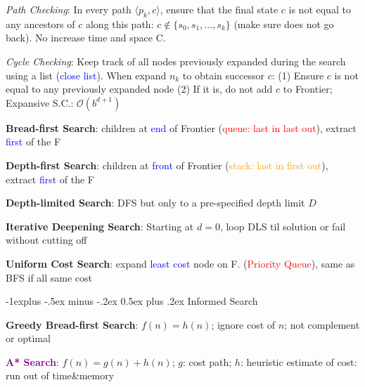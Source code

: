 \documentclass[7pt,landscape]{article}
\makeatletter
\renewcommand{\subsection}{\@startsection{subsection}{2}{0mm}%
                                {-1explus -.5ex minus -.2ex}%
                                {0.5ex plus .2ex}%
                                {\normalfont\normalsize\bfseries}}
\makeatother
\begin{document}
\begin{multicols}{2}
\textit{Path Checking}: In every path $\langle p_k, c \rangle$, ensure that the final state $c$ is not equal to any ancestors of $c$ along this path: $c \notin \{ s_0, s_1, ..., s_k\}$  (make sure does not go back). No increase time and space C.

\textit{Cycle Checking}: Keep track of all nodes previously expanded during the search using a list (\textcolor{blue}{close list}). When expand $n_k$ to obtain successor $c$: (1) Ensure $c$ is not equal to any previously expanded node (2) If it is, do not add $c$ to Frontier; Expansive S.C.: $\mathcal{O} (b^{d +1})$

\textbf{Bread-first Search}: children at \textcolor{blue}{end} of Frontier (\textcolor{red}{queue: last in last out}), extract \textcolor{blue}{first} of the F

\textbf{Depth-first Search}: children at \textcolor{blue}{front} of Frontier (\textcolor{orange}{stack: last in first out}), extract \textcolor{blue}{first} of the F

\textbf{Depth-limited Search}: DFS but only to a pre-specified depth limit $D$

\textbf{Iterative Deepening Search}: Starting at $d=0$, loop DLS til solution or fail without cutting off

\textbf{Uniform Cost Search}: expand \textcolor{blue}{least cost} node on F. (\textcolor{red}{Priority Queue}), same as BFS if all same cost

%
%

\subsection{Informed Search}

\textbf{Greedy Bread-first Search}: $f(n) = h(n)$; ignore cost of $n$; not complement or optimal

\textcolor{purple}{\textbf{A* Search}}: $f(n) = g(n) + h(n)$; $g$: cost path; $h$: heuristic estimate of cost: run out of time\&memory


\end{multicols}
\end{document}
